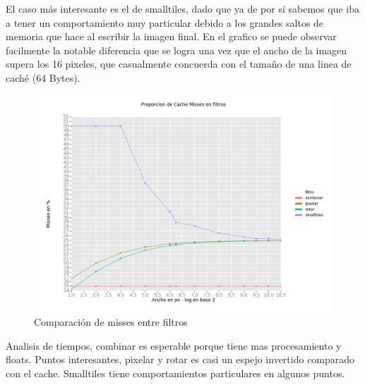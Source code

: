 \documentclass[a4paper]{article}
\begin{document}
El caso más interesante es el de smalltiles, dado que ya de por sí sabemos que iba a tener un comportamiento muy particular debido a los grandes saltos de memoria que hace al escribir la imagen final. En el grafico se puede observar facilmente la notable diferencia que se logra una vez que el ancho de la imagen supera los 16 pixeles, que casualmente concuerda con el tamaño de una linea de caché (64 Bytes).


\begin{figure}[!htb]
  \begin{center}
	\includegraphics[scale=0.6]{imagenes/diagramas/graficos/ProporcionCacheMissesEnFiltros.png}
	\caption{Comparación de misses entre filtros}
	\label{ProporcionCacheMissesEnFiltros}
  \end{center}
\end{figure}

Analisis de tiempos, combinar es esperable porque tiene mas procesamiento y floats. Puntos interesantes, pixelar y rotar es casi un espejo invertido comparado con el cache. Smalltiles tiene comportamientos particulares en algunos puntos.
\end{document}
